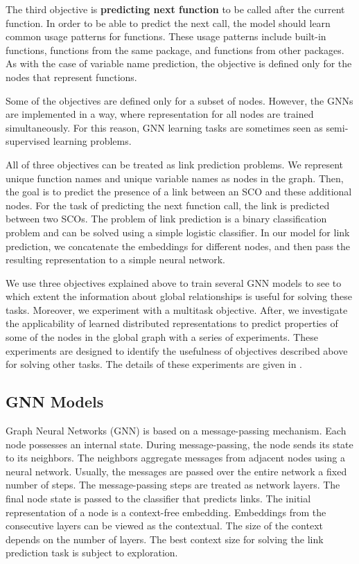 \documentclass[a4paper,twoside]{article}
\begin{document}
The third objective is \textbf{predicting next function} to be called after the current function. In order to be able to predict the next call, the model should learn common usage patterns for functions. These usage patterns include built-in functions, functions from the same package, and functions from other packages. As with the case of variable name prediction, the objective is defined only for the nodes that represent functions. 

Some of the objectives are defined only for a subset of nodes. However, the GNNs are implemented in a way, where representation for all nodes are trained simultaneously. For this reason, GNN learning tasks are sometimes seen as semi-supervised learning problems.

All of three objectives can be treated as link prediction problems. We represent unique function names and unique variable names as nodes in the graph. Then, the goal is to predict the presence of a link between an SCO and these additional nodes. For the task of predicting the next function call, the link is predicted between two SCOs. The problem of link prediction is a binary classification problem and can be solved using a simple logistic classifier. In our model for link prediction, we concatenate the embeddings for different nodes, and then pass the resulting representation to a simple neural network.

We use three objectives explained above to train several GNN models to see to which extent the information about global relationships is useful for solving these tasks. Moreover, we experiment with a multitask objective. After, we investigate the applicability of learned distributed representations to predict properties of some of the nodes in the global graph with a series of experiments. These experiments are designed to identify the usefulness of objectives described above for solving other tasks. The details of these experiments are given in .

\subsection{GNN Models}

Graph Neural Networks (GNN) is based on a message-passing mechanism. Each node possesses an internal state. During message-passing, the node sends its state to its neighbors. The neighbors aggregate messages from adjacent nodes using a neural network. Usually, the messages are passed over the entire network a fixed number of steps. The message-passing steps are treated as network layers. The final node state is passed to the classifier that predicts links. The initial representation of a node is a context-free embedding. Embeddings from the consecutive layers can be viewed as the contextual. The size of the context depends on the number of layers. The best context size for solving the link prediction task is subject to exploration.
\end{document}
